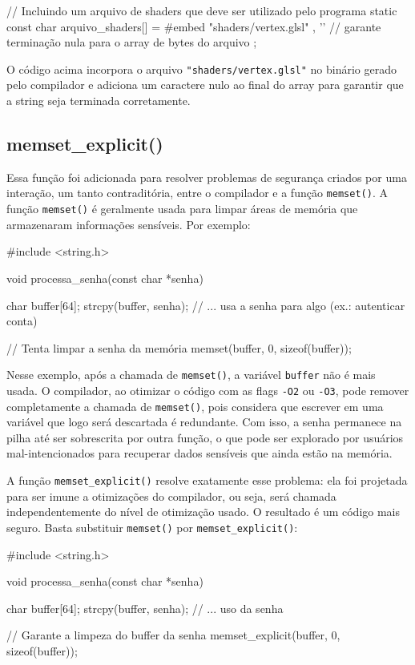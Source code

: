 \begin{excode}
// Incluindo um arquivo de shaders que deve ser utilizado pelo programa
static const char arquivo_shaders[] = {
    #embed "shaders/vertex.glsl"
    , '\0'  // garante terminação nula para o array de bytes do arquivo
};
\end{excode}

O código acima incorpora o arquivo \texttt{"shaders/vertex.glsl"} no binário 
gerado pelo compilador e adiciona um caractere nulo ao final do array para 
garantir que a string seja terminada corretamente.

\subsection{memset\_explicit()}

Essa função foi adicionada para resolver problemas de segurança criados por uma 
interação, um tanto contraditória, entre o compilador e a função 
\texttt{memset()}. A função \texttt{memset()} é geralmente usada para limpar 
áreas de memória que armazenaram informações sensíveis. Por exemplo:

\begin{excode}
#include <string.h>

void processa_senha(const char *senha)
{
    char buffer[64];
    strcpy(buffer, senha);
    // ... usa a senha para algo (ex.: autenticar conta)

    // Tenta limpar a senha da memória
    memset(buffer, 0, sizeof(buffer));
}
\end{excode}

Nesse exemplo, após a chamada de \texttt{memset()}, a variável \texttt{buffer} 
não é mais usada. O compilador, ao otimizar o código com as flags \texttt{-O2} 
ou \texttt{-O3}, pode remover completamente a chamada de \texttt{memset()}, pois 
considera que escrever em uma variável que logo será descartada é redundante. 
Com isso, a senha permanece na pilha até ser sobrescrita por outra função, o que 
pode ser explorado por usuários mal-intencionados para recuperar dados sensíveis 
que ainda estão na memória.

A função \texttt{memset\_explicit()} resolve exatamente esse problema: ela foi 
projetada para ser imune a otimizações do compilador, ou seja, será chamada 
independentemente do nível de otimização usado. O resultado é um código mais 
seguro. Basta substituir \texttt{memset()} por \texttt{memset\_explicit()}:

\begin{excode}
#include <string.h>

void processa_senha(const char *senha)
{
    char buffer[64];
    strcpy(buffer, senha);
    // ... uso da senha

    // Garante a limpeza do buffer da senha
    memset_explicit(buffer, 0, sizeof(buffer));
}
\end{excode}

